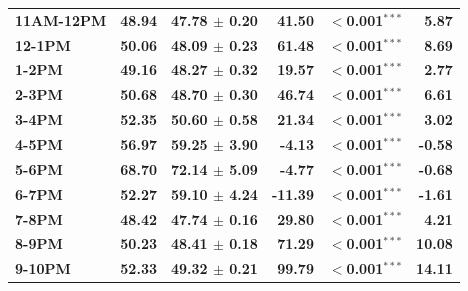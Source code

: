 \documentclass[12pt]{article}
\begin{document}
\begin{table}[H]
\begin{tabular}{lrrrrr}
{\boldmath\bfseries 11AM-12PM} & {\boldmath\bfseries 48.94} & {\boldmath\bfseries 47.78 $\pm$ 0.20} & {\boldmath\bfseries 41.50} & {\boldmath\bfseries $<$0.001$^{***}$} & {\boldmath\bfseries 5.87} \\
{\boldmath\bfseries 12-1PM} & {\boldmath\bfseries 50.06} & {\boldmath\bfseries 48.09 $\pm$ 0.23} & {\boldmath\bfseries 61.48} & {\boldmath\bfseries $<$0.001$^{***}$} & {\boldmath\bfseries 8.69} \\
{\boldmath\bfseries 1-2PM} & {\boldmath\bfseries 49.16} & {\boldmath\bfseries 48.27 $\pm$ 0.32} & {\boldmath\bfseries 19.57} & {\boldmath\bfseries $<$0.001$^{***}$} & {\boldmath\bfseries 2.77} \\
{\boldmath\bfseries 2-3PM} & {\boldmath\bfseries 50.68} & {\boldmath\bfseries 48.70 $\pm$ 0.30} & {\boldmath\bfseries 46.74} & {\boldmath\bfseries $<$0.001$^{***}$} & {\boldmath\bfseries 6.61} \\
{\boldmath\bfseries 3-4PM} & {\boldmath\bfseries 52.35} & {\boldmath\bfseries 50.60 $\pm$ 0.58} & {\boldmath\bfseries 21.34} & {\boldmath\bfseries $<$0.001$^{***}$} & {\boldmath\bfseries 3.02} \\
{\boldmath\bfseries 4-5PM} & {\boldmath\bfseries 56.97} & {\boldmath\bfseries 59.25 $\pm$ 3.90} & {\boldmath\bfseries -4.13} & {\boldmath\bfseries $<$0.001$^{***}$} & {\boldmath\bfseries -0.58} \\
{\boldmath\bfseries 5-6PM} & {\boldmath\bfseries 68.70} & {\boldmath\bfseries 72.14 $\pm$ 5.09} & {\boldmath\bfseries -4.77} & {\boldmath\bfseries $<$0.001$^{***}$} & {\boldmath\bfseries -0.68} \\
{\boldmath\bfseries 6-7PM} & {\boldmath\bfseries 52.27} & {\boldmath\bfseries 59.10 $\pm$ 4.24} & {\boldmath\bfseries -11.39} & {\boldmath\bfseries $<$0.001$^{***}$} & {\boldmath\bfseries -1.61} \\
{\boldmath\bfseries 7-8PM} & {\boldmath\bfseries 48.42} & {\boldmath\bfseries 47.74 $\pm$ 0.16} & {\boldmath\bfseries 29.80} & {\boldmath\bfseries $<$0.001$^{***}$} & {\boldmath\bfseries 4.21} \\
{\boldmath\bfseries 8-9PM} & {\boldmath\bfseries 50.23} & {\boldmath\bfseries 48.41 $\pm$ 0.18} & {\boldmath\bfseries 71.29} & {\boldmath\bfseries $<$0.001$^{***}$} & {\boldmath\bfseries 10.08} \\
{\boldmath\bfseries 9-10PM} & {\boldmath\bfseries 52.33} & {\boldmath\bfseries 49.32 $\pm$ 0.21} & {\boldmath\bfseries 99.79} & {\boldmath\bfseries $<$0.001$^{***}$} & {\boldmath\bfseries 14.11} \\

\end{tabular}
\end{table}
\end{document}
